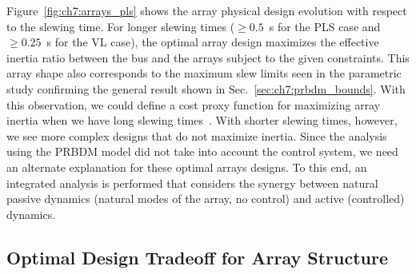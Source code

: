 

Figure~\ref{fig:ch7:arrays_pls} shows the array physical design evolution with respect to the slewing time. For longer slewing times ($\geq 0.5$~s for the PLS case and $\geq 0.25$~s for the VL case), the optimal array design maximizes the effective inertia ratio between the bus and the arrays subject to the given constraints. This array shape also corresponds to the maximum slew limits seen in the parametric study confirming the general result shown in Sec.~\ref{sec:ch7:prbdm_bounds}. With this observation, we could define a cost proxy function for maximizing array inertia when we have long slewing times~\cite{Allison2013d}. With shorter slewing times, however, we see more complex designs that do not maximize inertia. Since the analysis using the PRBDM model did not take into account the control system, we need an alternate explanation for these optimal arrays designs. To this end, an integrated analysis is performed that considers the synergy between natural passive dynamics (natural modes of the array, no control) and active (controlled) dynamics.

\subsection{Optimal Design Tradeoff for Array Structure}

